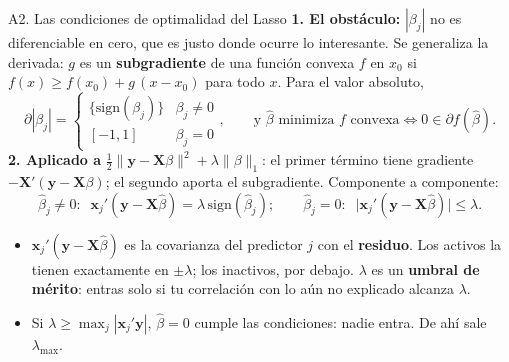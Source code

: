 \documentclass{beamer}
\newcommand{\1}{\mathbb{I}}
\newcommand{\sign}{\mathrm{sign}}
\begin{document}
\begin{frame}{A2. Las condiciones de optimalidad del Lasso}
\small
\textbf{1. El obstáculo:} $|\beta_j|$ no es diferenciable en cero, que es justo donde ocurre lo interesante. Se generaliza la derivada: $g$ es un \textbf{subgradiente} de una función convexa $f$ en $x_0$ si $f(x) \geq f(x_0) + g\,(x - x_0)$ para todo $x$. Para el valor absoluto,
\[ \partial |\beta_j| = \begin{cases} \{\sign(\beta_j)\} & \beta_j \neq 0 \\ [-1, 1] & \beta_j = 0 \end{cases}, \qquad \text{y } \hat{\beta} \text{ minimiza } f \text{ convexa} \iff 0 \in \partial f(\hat{\beta}). \]
\pause
\textbf{2. Aplicado a} $\tfrac{1}{2}\|\mathbf{y} - \mathbf{X}\beta\|^2 + \lambda\|\beta\|_1$: el primer término tiene gradiente $-\mathbf{X}'(\mathbf{y} - \mathbf{X}\beta)$; el segundo aporta el subgradiente. Componente a componente:
\[ \boxed{\; \hat{\beta}_j \neq 0: \;\; \mathbf{x}_j'(\mathbf{y} - \mathbf{X}\hat{\beta}) = \lambda\,\sign(\hat{\beta}_j); \qquad \hat{\beta}_j = 0: \;\; \big|\mathbf{x}_j'(\mathbf{y} - \mathbf{X}\hat{\beta})\big| \leq \lambda. \;} \]
\pause
\begin{itemize}\itemsep3pt
  \item $\mathbf{x}_j'(\mathbf{y} - \mathbf{X}\hat{\beta})$ es la covarianza del predictor $j$ con el \textbf{residuo}. Los activos la tienen exactamente en $\pm\lambda$; los inactivos, por debajo. $\lambda$ es un \textbf{umbral de mérito}: entras solo si tu correlación con lo aún no explicado alcanza $\lambda$.
  \item Si $\lambda \geq \max_j |\mathbf{x}_j'\mathbf{y}|$, $\hat{\beta} = 0$ cumple las condiciones: nadie entra. De ahí sale $\lambda_{\max}$.
\end{itemize}
\end{frame}
\end{document}
